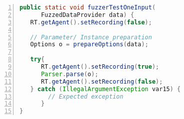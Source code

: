 \begin{lstlisting}[language=Java,caption={Conceptual decompiled harness showing selective coverage instrumentation through runtime control of JaCoCo's recording state. The coverage handling calls are added using offline instrumentation after compilation.},label={lst:coverage-tracking},float=htbp,basicstyle=\small\ttfamily,numbers=left,numberstyle=\tiny\color{gray},frame=single]
public static void fuzzerTestOneInput(
      FuzzedDataProvider data) {
   RT.getAgent().setRecording(false);

   // Parameter/ Instance preparation
   Options o = prepareOptions(data);

   try{
      RT.getAgent().setRecording(true);
      Parser.parse(o);
      RT.getAgent().setRecording(false);
   } catch (IllegalArgumentException var15) {
        // Expected exception 
      }
}
\end{lstlisting}